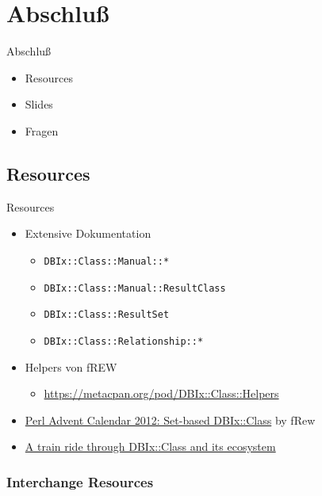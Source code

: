 \section{Abschluß}

\begin{frame}{Abschluß}
\begin{itemize}
\item Resources
\item Slides
\item Fragen
\end{itemize}
\end{frame}

\subsection{Resources}
\begin{frame}[fragile]{Resources}
\begin{itemize}
\item Extensive Dokumentation
\begin{itemize}
\item \verb|DBIx::Class::Manual::*|
\item \verb|DBIx::Class::Manual::ResultClass|
\item \verb|DBIx::Class::ResultSet|
\item \verb|DBIx::Class::Relationship::*|
\end{itemize}
\item Helpers von fREW
\begin{itemize}
\item \href{https://metacpan.org/pod/DBIx::Class::Helpers}{https://metacpan.org/pod/DBIx::Class::Helpers}
\end{itemize}
\item \href{http://www.perladvent.org/2012/2012-12-21.html}
{Perl Advent Calendar 2012: Set-based DBIx::Class}
by fRew
\item \href{https://wiki.linuxia.de/library/stefan-hornburg-racke-a-train-ride-through-dbix-class-and-its-ecosystem-en}{A train ride through DBIx::Class and its ecosystem} 
\end{itemize}


\end{frame}

\subsubsection{Interchange Resources}

